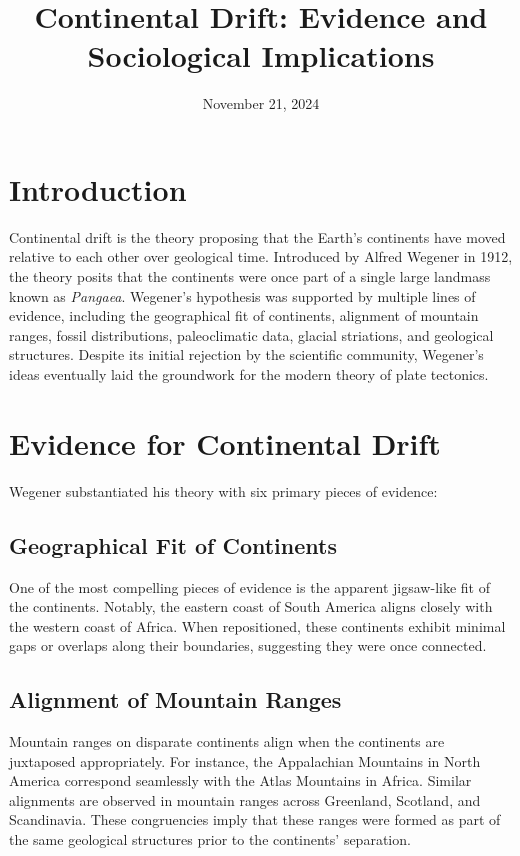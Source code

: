 \documentclass{article}
\begin{document}
\title{Continental Drift: Evidence and Sociological Implications}
\author{}
\date{November 21, 2024}

\maketitle

\section*{Introduction}

Continental drift is the theory proposing that the Earth's continents have moved relative to each other over geological time. Introduced by Alfred Wegener in 1912, the theory posits that the continents were once part of a single large landmass known as \emph{Pangaea}. Wegener's hypothesis was supported by multiple lines of evidence, including the geographical fit of continents, alignment of mountain ranges, fossil distributions, paleoclimatic data, glacial striations, and geological structures. Despite its initial rejection by the scientific community, Wegener's ideas eventually laid the groundwork for the modern theory of plate tectonics.

\section{Evidence for Continental Drift}

Wegener substantiated his theory with six primary pieces of evidence:

\subsection{Geographical Fit of Continents}

One of the most compelling pieces of evidence is the apparent jigsaw-like fit of the continents. Notably, the eastern coast of South America aligns closely with the western coast of Africa. When repositioned, these continents exhibit minimal gaps or overlaps along their boundaries, suggesting they were once connected.

\subsection{Alignment of Mountain Ranges}

Mountain ranges on disparate continents align when the continents are juxtaposed appropriately. For instance, the Appalachian Mountains in North America correspond seamlessly with the Atlas Mountains in Africa. Similar alignments are observed in mountain ranges across Greenland, Scotland, and Scandinavia. These congruencies imply that these ranges were formed as part of the same geological structures prior to the continents' separation.
\end{document}
